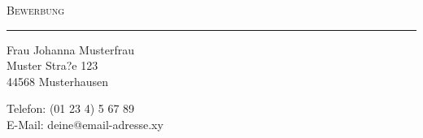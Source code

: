\documentclass[11pt]{dinbrief}%
\date{}%
\begin{document}
\address{}%
\begin{letter}{}%
\opening{}%


\vspace{-9cm}
\begin{center}\textsc{\Huge Bewerbung}\end{center}
\hrule
\vspace{4cm}
\begin{center}
\end{center}
\begin{center}
	\begin{large}
			Frau Johanna Musterfrau \\
			Muster Stra?e 123\\
			44568 Musterhausen\par
			Telefon: (01 23 4) 5 67 89 \\
			E-Mail: deine@email-adresse.xy
	\end{large}
\end{center}
\closing{} %
\end{letter}


\date{den \today}
\signature{$\overline{\hspace{1.5 cm}\textnormal{\textit{Johanna Musterfrau}}\hspace{1.5 cm}}$}
\centeraddress
\enabledraftstandard
\end{document}
